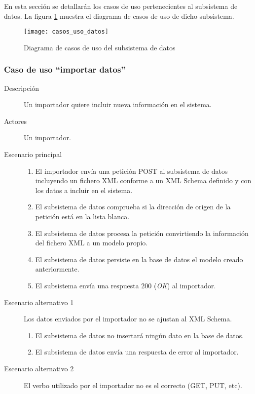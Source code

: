En esta sección se detallarán los casos de uso pertenecientes al subsistema de datos. La figura \ref{fig:casos_uso_subsistema_datos} muestra el diagrama de casos de uso de dicho subsistema.

\begin{figure}[h]
\centering
\texttt{[image: casos\_uso\_datos]}
\caption{Diagrama de casos de uso del subsistema de datos}
\label{fig:casos_uso_subsistema_datos}
\end{figure}

\subsubsection{Caso de uso ``importar datos''}
\begin{description}
\item[Descripción] Un importador quiere incluir nueva información en el sistema.
\item[Actores] Un importador.
\item[Escenario principal] \hfill
							\begin{enumerate}
							\item El importador envía una petición POST al subsistema de datos incluyendo un fichero XML conforme a un XML Schema definido y con los datos a incluir en el sistema.
							\item El subsistema de datos comprueba si la dirección de origen de la petición está en la lista blanca.
							\item El subsistema de datos procesa la petición convirtiendo la información del fichero XML a un modelo propio.
							\item El subsistema de datos persiste en la base de datos el modelo creado anteriormente.
							\item El subsistema envía una respuesta 200 (\textit{OK}) al importador.
							\end{enumerate}
\item[Escenario alternativo 1] Los datos enviados por el importador no se ajustan al XML Schema.
							\begin{enumerate}
							\item El subsistema de datos no insertará ningún dato en la base de datos.
							\item El subsistema de datos envía una respuesta de error al importador.
							\end{enumerate}
\item[Escenario alternativo 2] El verbo utilizado por el importador no es el correcto (GET, PUT, etc).

\end{description}
